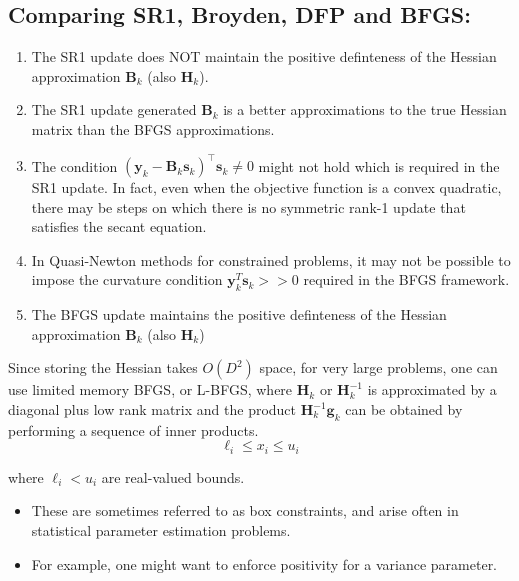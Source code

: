 \documentclass[11pt]{article}
\theoremstyle{plain} %
\newenvironment{topic}
{\color{C2}\normalfont\begin{framed}\begingroup }
  {\endgroup\end{framed}}
\theoremstyle{remark}
\newenvironment{remark}
  {\pushQED{\qed}\renewcommand{\qedsymbol}{$\triangle$}\remarkx}
  {\popQED\endremarkx}
\begin{document}
\subsection{Comparing SR1, Broyden, DFP and BFGS:}
\begin{topic}
  \begin{enumerate}
    \item The SR1 update does NOT maintain the positive definteness of the Hessian approximation $\mathbf{B}_k$ (also $\mathbf{H}_k$).
    \item The SR1 update generated $\mathbf{B}_k$ is a better approximations to the
          true Hessian matrix than the BFGS approximations.
    \item The condition $\left(\mathbf{y}_k-\mathbf{B}_k \mathbf{s}_k\right)^{\top} \mathbf{s}_k \neq 0$ might not hold which is required in
          the SR1 update. In fact, even when the objective function is a convex quadratic,
          there may be steps on which there is no symmetric rank-1 update that satisfies
          the secant equation.
    \item In Quasi-Newton methods for constrained problems, it may not be possible to impose
          the curvature condition $\mathbf{y}_k^T \mathbf{s}_k> >0$ required in the BFGS framework.
    \item The BFGS update maintains the positive definteness of the Hessian approximation $\mathbf{B}_k$ (also $\mathbf{H}_k$)
  \end{enumerate}

  \begin{remark}
    Since storing the Hessian takes $O\left(D^{2}\right)$ space, for very large
    problems, one can use limited memory BFGS, or L-BFGS, where
    $\boldsymbol{H}_{k}$ or $\boldsymbol{H}_{k}^{-1}$ is approximated by a
    diagonal plus low rank matrix and the product $\boldsymbol{H}_{k}^{-1}
      \boldsymbol{g}_{k}$ can be obtained by performing a sequence of inner
    products.
    $$
      \ell_{i} \leq x_{i} \leq u_{i}
    $$

    where $\ell_{i}<u_{i}$ are real-valued bounds.

    \begin{itemize}
      \item These are sometimes referred to as box constraints, and arise often in statistical parameter estimation problems.

      \item For example, one might want to enforce positivity for a variance parameter.
    \end{itemize}
  \end{remark}

\end{topic}
\end{document}
